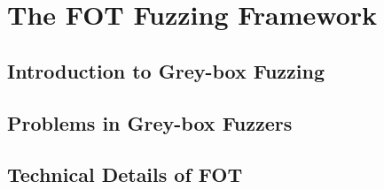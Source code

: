 
\chapter{The FOT Fuzzing Framework} \label{Chapter6}

\section{Introduction to Grey-box Fuzzing}

\section{Problems in Grey-box Fuzzers}


\section{Technical Details of FOT}
